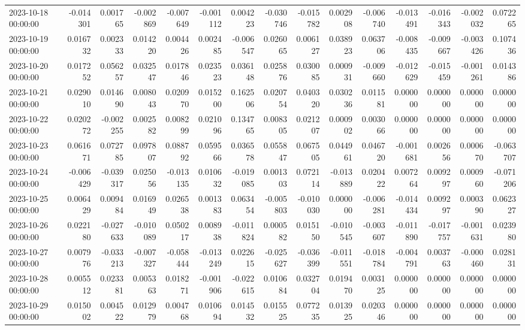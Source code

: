 \begin{tabular}{lrrrrrrrrrrrrrr}
2023-10-18 00:00:00 & -0.014301 & 0.001765 & -0.002869 & -0.007649 & -0.001112 & 0.004223 & -0.030746 & -0.015782 & 0.002908 & -0.006740 & -0.013491 & -0.016343 & -0.002032 & 0.072265 \\
2023-10-19 00:00:00 & 0.016732 & 0.002333 & 0.014220 & 0.004426 & 0.002485 & -0.006547 & 0.026065 & 0.006127 & 0.038923 & 0.063706 & -0.008435 & -0.009667 & -0.003426 & 0.107436 \\
2023-10-20 00:00:00 & 0.017252 & 0.056257 & 0.032547 & 0.017846 & 0.023523 & 0.036148 & 0.025876 & 0.030085 & 0.000931 & -0.009660 & -0.012629 & -0.015459 & -0.001261 & 0.014386 \\
2023-10-21 00:00:00 & 0.029010 & 0.014690 & 0.008043 & 0.020970 & 0.015200 & 0.162506 & 0.020754 & 0.040320 & 0.030236 & 0.011581 & 0.000000 & 0.000000 & 0.000000 & 0.000000 \\
2023-10-22 00:00:00 & 0.020272 & -0.002255 & 0.002582 & 0.008299 & 0.021096 & 0.134765 & 0.008305 & 0.021207 & 0.000902 & 0.003066 & 0.000000 & 0.000000 & 0.000000 & 0.000000 \\
2023-10-23 00:00:00 & 0.061671 & 0.072785 & 0.097807 & 0.088792 & 0.059566 & 0.036578 & 0.055847 & 0.067505 & 0.044961 & 0.046720 & -0.001681 & 0.002656 & 0.000670 & -0.063707 \\
2023-10-24 00:00:00 & -0.006429 & -0.039317 & 0.025056 & -0.013135 & 0.010632 & -0.019085 & 0.001303 & 0.072114 & -0.013889 & 0.020422 & 0.007264 & 0.009297 & 0.000960 & -0.071206 \\
2023-10-25 00:00:00 & 0.006429 & 0.009484 & 0.016949 & 0.026538 & 0.001383 & 0.063454 & -0.005803 & -0.010030 & 0.000000 & -0.006281 & -0.014434 & 0.009297 & 0.000390 & 0.062327 \\
2023-10-26 00:00:00 & 0.022180 & -0.027633 & -0.010089 & 0.050217 & 0.008938 & -0.011824 & 0.000582 & 0.015150 & -0.010545 & -0.003607 & -0.011890 & -0.017757 & -0.001631 & 0.023980 \\
2023-10-27 00:00:00 & 0.007976 & -0.033213 & -0.007327 & -0.058444 & -0.013249 & 0.022615 & -0.025627 & -0.036399 & -0.011551 & -0.018784 & -0.004791 & 0.003763 & -0.000460 & 0.028131 \\
2023-10-28 00:00:00 & 0.005512 & 0.023381 & 0.005363 & 0.018271 & -0.001906 & -0.022615 & 0.010684 & 0.032704 & 0.019470 & 0.003125 & 0.000000 & 0.000000 & 0.000000 & 0.000000 \\
2023-10-29 00:00:00 & 0.015002 & 0.004522 & 0.012979 & 0.004768 & 0.010694 & 0.014532 & 0.015525 & 0.077235 & 0.013925 & 0.020346 & 0.000000 & 0.000000 & 0.000000 & 0.000000 \\

\end{tabular}
